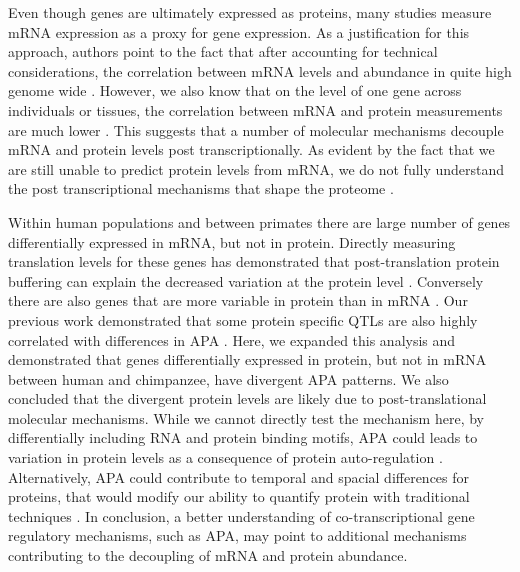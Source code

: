 Even though genes are ultimately expressed as proteins, many studies measure mRNA expression as a proxy for gene expression. As a justification for this approach, authors point to the fact that after accounting for technical considerations, the correlation between mRNA levels and abundance in quite high genome wide \citep{buccitelli_mrnas_2020,csardi_accounting_2015}. However, we also know that on the level of one gene across individuals or tissues, the correlation between mRNA and protein measurements are much lower \citep{battle_impact_2015,buccitelli_mrnas_2020}. This suggests that a number of molecular mechanisms decouple mRNA and protein levels post transcriptionally. As evident by the fact that we are still unable to predict protein levels from mRNA, we do not fully understand the post transcriptional mechanisms that shape the proteome \citep{buccitelli_mrnas_2020}.

Within human populations and between primates there are large number of genes differentially expressed in mRNA, but not in protein. Directly measuring translation levels for these genes has demonstrated that post-translation protein buffering can explain the decreased variation at the protein level \citep{battle_impact_2015,wang_post-translational_2018}. Conversely there are also genes that are more variable in protein than in mRNA \citep{battle_impact_2015,chick_defining_2016, khan_primate_2013}. Our previous work demonstrated that some protein specific QTLs are also highly correlated with differences in APA \citep{mittleman_alternative_2020}. Here, we expanded this analysis and demonstrated that genes differentially expressed in protein, but not in mRNA between human and chimpanzee, have divergent APA patterns. We also concluded that the divergent protein levels are likely due to post-translational molecular mechanisms. While we cannot directly test the mechanism here, by differentially including RNA and protein binding motifs, APA could leads to variation in protein levels as a consequence of  protein auto-regulation \citep{buccitelli_mrnas_2020,de_bie_ubiquitination_2011, muller-mcnicoll_auto-regulatory_2019}. Alternatively, APA could contribute to temporal and spacial differences for proteins, that would modify our ability to quantify protein with traditional techniques \citep{buccitelli_mrnas_2020,tian_alternative_2017}. In conclusion, a better understanding of co-transcriptional gene regulatory mechanisms, such as APA, may point to additional mechanisms contributing to the decoupling of mRNA and protein abundance.  


